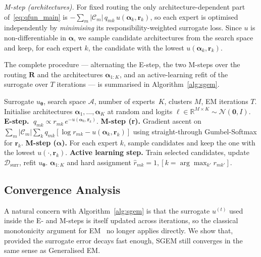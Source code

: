 \emph{M-step (architectures).} For fixed routing the only
architecture-dependent part of~\eqref{eq:qfun_main} is
$-\sum_{m} |\mathcal{C}_m|\, q_{mk}\, u(\boldsymbol{\alpha}_k, \mathbf{r}_k)$,
so each expert is optimised independently by \emph{minimising} its
responsibility-weighted surrogate loss. Since
$u$ is non-differentiable in $\boldsymbol{\alpha}$, we sample candidate
architectures from the search space and keep, for each expert $k$, the
candidate with the lowest $u(\boldsymbol{\alpha}_k, \mathbf{r}_k)$.

The complete procedure --- alternating the E-step, the two M-steps over
the routing $\mathbf{R}$ and the architectures $\boldsymbol{\alpha}_{1:K}$,
and an active-learning refit of the surrogate over $T$ iterations --- is
summarised in Algorithm~\ref{alg:sgem}.

\begin{algorithm}[h]
\caption{Surrogate-assisted Generalized EM (SGEM) for MoE Architecture Search}
\label{alg:sgem}
\begin{algorithmic}[1]
\Require Surrogate $u_{\boldsymbol{\theta}}$, search space
$\mathcal{A}$, number of experts~$K$, clusters $M$,
EM iterations $T$.
\State Initialise architectures
$\boldsymbol{\alpha}_1, \dots, \boldsymbol{\alpha}_K$ at random and
logits $\boldsymbol{\ell}\!\in\!\mathbb{R}^{M\times K}\!\sim\!\mathcal{N}(\mathbf{0}, I)$.
    \State \textbf{E-step.} $\;q_{mk} \propto r_{mk}\, e^{-u(\boldsymbol{\alpha}_k, \mathbf{r}_k)}$.
    \State \textbf{M-step (r).} Gradient ascent on
    $\sum_m |\mathcal{C}_m|\sum_k q_{mk}[\log r_{mk} - u(\boldsymbol{\alpha}_k, \mathbf{r}_k)]$
    using straight-through Gumbel-Softmax for $\mathbf{r}_k$.
    \State \textbf{M-step ($\boldsymbol{\alpha}$).} For each expert
    $k$, sample candidates and keep the one with the lowest $u(\cdot, \mathbf{r}_k)$.
    \State \textbf{Active learning step.} Train selected candidates,
    update $\mathcal{D}_{\text{surr}}$, refit $u_{\boldsymbol{\theta}}$.
\EndFor
\State \Return $\boldsymbol{\alpha}_{1:K}$ and hard assignment
$\hat{r}_{mk} = 1, [k = \arg\max_{k'} r_{mk'}]$.
\end{algorithmic}
\end{algorithm}

\subsection{Convergence Analysis}
\label{subsec:theory}

A natural concern with Algorithm~\ref{alg:sgem} is that the surrogate
$u^{(t)}$ used inside the E- and M-steps is itself updated across
iterations, so the classical monotonicity argument for
EM~\cite{dempster1977em,wu1983convergence} no longer applies
directly. We show that, provided the surrogate error decays fast
enough, SGEM still converges in the same sense as Generalised EM.

